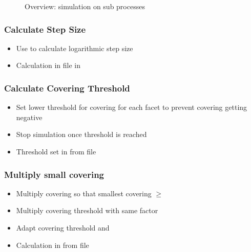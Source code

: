 \begin{figure}[!h]
\caption{Overview: simulation on sub processes}
\end{figure}

\subsubsection{Calculate Step Size}
\begin{itemize}[noitemsep,topsep=0pt, partopsep=0pt]
\item Use  to calculate logarithmic step size
\item Calculation in  file in 
\end{itemize}

\subsubsection{Calculate Covering Threshold}
\begin{itemize}[noitemsep,topsep=0pt, partopsep=0pt]
\item Set lower threshold for covering for each facet to prevent covering getting negative
\item Stop simulation once threshold is reached
\item Threshold set in   from  file
\end{itemize}

\subsubsection{Multiply small covering}
\begin{itemize}[noitemsep,topsep=0pt, partopsep=0pt]
\item Multiply covering so that smallest covering $\geq$ 
\item Multiply covering threshold with same factor
\item Adapt covering threshold and 
\item Calculation in  from  file
\end{itemize}

